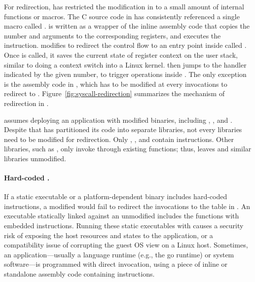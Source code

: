 For \linuxapi{} redirection,
\graphene{} has restricted the modification in \glibc{}
to a small amount of
internal functions or macros.
The C source code in \glibc{} has consistently referenced a single macro called
.
 is written as a wrapper of the inline assembly code
that copies the \linuxapi{} number and arguments to the corresponding registers,
and executes the  instruction.
\graphene{} modifies 
to redirect the control flow to
an entry point inside \thelibos{} called .
Once  is called, it saves the current state of register context on the user stack, similar to doing a context switch into a Linux kernel.
 then jumps to the \linuxapi{} handler
indicated by the given \linuxapi{} number, to trigger operations inside \thelibos{}.
The only exception is the assembly code in \glibc{}, which has
to be modified at every \linuxapi{} invocations to redirect to .
Figure~\ref{fig:syscall-redirection} summarizes the mechanism of \linuxapi{} redirection in \graphene{}.


\graphene{} assumes deploying an application %
with modified \glibc{} binaries,
including , \libpthread{}, and \libdl{}.
Despite that \glibc{} has partitioned its code into separate libraries, not every libraries need to be modified for \linuxapi{} redirection.
Only , \libpthread{}, and \libdl{} contain  instructions.
Other \libc{} libraries, such as ,
only invoke \linuxapis{} through existing \libc{} functions;
thus, \graphene{} leaves  and similar \libc{} libraries unmodified.



\paragraph{Hard-coded \linuxapis{}.}
If a static executable or a platform-dependent binary
includes hard-coded  instructions,
a modified \libc{} would fail to redirect the \linuxapi{} invocations to the \linuxapi{} table in \thelibos{}. %
An executable
statically linked against an unmodified \libc{}
includes
the \libc{} functions
with embedded  instructions.
Running these static executables with \graphene{} causes a security risk
of exposing the host resources and states to the application,
or a compatibility issue of corrupting the guest OS view on a Linux host.
Sometimes, an application---usually a language runtime (e.g., the go runtime)
or system software---is programmed
with direct \linuxapi{} invocation,
using a piece of inline or standalone assembly code
containing
 instructions.


